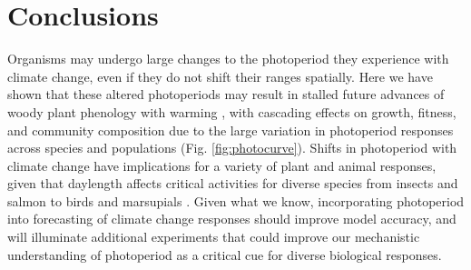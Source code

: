 \documentclass{article}
\begin{document}
\section*{Conclusions}
Organisms may undergo large changes to the photoperiod they experience with climate change, even if they do not shift their ranges spatially. Here we have shown that these altered photoperiods may result in stalled future advances of woody plant phenology with warming \cite[e.g.,Table S1, Fig. \ref{fig:fagus},][]{fu2019, gusewell2017,yu2010}, with cascading effects on growth, fitness, and community composition due to the large variation in photoperiod responses across species and populations (Fig. \ref{fig:photocurve}). Shifts in photoperiod with climate change have implications for a variety of plant and animal responses, given that daylength affects critical activities for diverse species from insects \citep{bradshaw2006,linn1996} and salmon \citep{solbakken1994,taranger2003} to birds \citep{dawson2001} and marsupials \citep{mcallan2006,solbakken1994}. Given what we know, incorporating photoperiod into forecasting of climate change responses should improve model accuracy, and will illuminate additional experiments that could improve our mechanistic understanding of photoperiod as a critical cue for diverse biological responses. 
\end{document}
